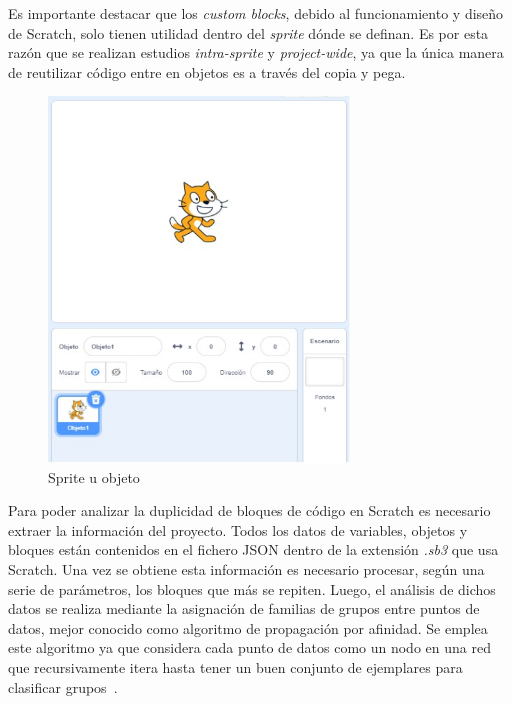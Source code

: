 \documentclass[a4paper, 12pt]{book}
\begin{document}
Es importante destacar que los \textit{custom blocks}, debido al funcionamiento y diseño de Scratch, solo tienen utilidad dentro del \textit{sprite} dónde se definan. Es por esta razón que se realizan estudios \textit{intra-sprite} y \textit{project-wide}, ya que la única manera de reutilizar código entre en objetos es a través del copia y pega. %
 
\begin{figure}[htb!]
	\centering
    \includegraphics[width=8cm, keepaspectratio]{img/scratchsprite.jpg}
    \caption{Sprite u objeto}
    \label{fig:scratchsprite}
\end{figure}

Para poder analizar la duplicidad de bloques de código en Scratch es necesario extraer la información del proyecto. Todos los datos de variables, objetos y bloques están contenidos en el fichero JSON dentro de la extensión \emph{.sb3} que usa Scratch. Una vez se obtiene esta información es necesario procesar, según una serie de parámetros, los bloques que más se repiten. Luego, el análisis de dichos datos se realiza mediante la asignación de familias de grupos entre puntos de datos, mejor conocido como algoritmo de propagación por afinidad. Se emplea este algoritmo ya que considera cada punto de datos como un nodo en una red que recursivamente itera hasta tener un buen conjunto de ejemplares para clasificar grupos~\cite{clusteringpaper}.
\end{document}
